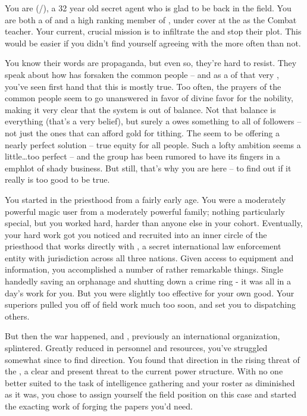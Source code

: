 \documentclass[char]{GL2020}
\begin{document}
\name{\cInterpol{}}

You are \cInterpol{} (\cInterpol{\they}/\cInterpol{\them}), a 32 year old secret agent who is glad to be back in the field. You are both a \cInterpol{\cleric} of \cFarmGod{} and a high ranking member of \pInterpol{}, under cover at the \pSchool{} as the Combat teacher. Your current, crucial mission is to infiltrate the \pGoaties{} and stop their plot. This would be easier if you didn’t find yourself agreeing with the \pGoaties{} more often than not.

You know their words are propaganda, but even so, they’re hard to resist. They speak about how \cFarmGod{} has forsaken the common people -- and as a \cInterpol{\cleric} of that very \cFarmGod{\Deity}, you’ve seen first hand that this is mostly true. Too often, the prayers of the common people seem to go unanswered in favor of divine favor for the nobility, making it very clear that the system is out of balance. Not that balance is everything (that’s a very \pShip{} belief), but surely a \cFarmGod{\God} owes something to all of \cFarmGod{\their} followers -- not just the ones that can afford gold for tithing. The \pGoaties{} seem to be offering a nearly perfect solution -- true equity for all people. Such a lofty ambition seems a little\dots too perfect -- and the group has been rumored to have its fingers in a emph{lot} of shady business. But still, that’s why you are here -- to find out if it really is too good to be true. 

You started in the priesthood from a fairly early age. You were a moderately powerful magic user from a moderately powerful family; nothing particularly special, but you worked hard, harder than anyone else in your cohort. Eventually, your hard work got you noticed and recruited into an inner circle of the priesthood that works directly with \pInterpol{}, a secret international law enforcement entity with jurisdiction across all three nations. Given access to equipment and information, you accomplished a number of rather remarkable things. Single handedly saving an orphanage and shutting down a crime ring - it was all in a day's work for you. But you were slightly too effective for your own good. Your superiors pulled you off of field work much too soon, and set you to dispatching others.

But then the war happened, and \pInterpol{}, previously an international organization, splintered. Greatly reduced in personnel and resources, you’ve struggled somewhat since to find direction. You found that direction in the rising threat of the \pGoaties{}, a clear and present threat to the current power structure. With no one better suited to the task of intelligence gathering and your roster as diminished as it was, you chose to assign yourself the field position on this case and started the exacting work of forging the papers you’d need.
\end{document}
